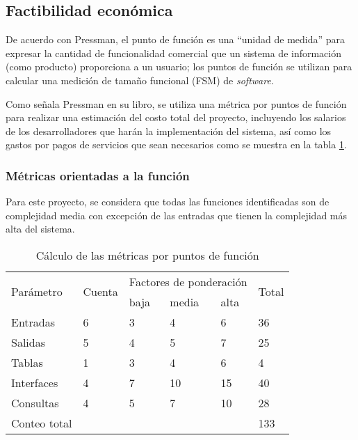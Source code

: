 \subsection{Factibilidad económica}

De acuerdo con Pressman\cite{pressman_software_2005}, el punto de función es una ``unidad de medida'' para expresar la cantidad de funcionalidad comercial que un sistema de información (como producto) proporciona a un usuario; los puntos de función se utilizan para calcular una medición de tamaño funcional (FSM) de \textit{software}.

Como señala Pressman en su libro, se utiliza una métrica por puntos de función para realizar una estimación del costo total del proyecto, incluyendo los salarios de los desarrolladores que harán la implementación del sistema, así como los gastos por pagos de servicios que sean necesarios como se muestra en la tabla \ref{tab:function_point_metrics}. 

\subsubsection*{Métricas orientadas a la función}


Para este proyecto, se considera que todas las funciones identificadas son de complejidad media con excepción de las entradas que tienen la complejidad más alta del sistema.


\begin{table}[H]
	\centering
	\begin{tabular}{|l|l|l|l|l|l|}
	\hline
	\multirow{2}{*}{Parámetro} & \multirow{2}{*}{Cuenta} & \multicolumn{3}{|l|}{Factores de ponderación} & \multirow{2}{*}{Total} \\ \cline{3-5}
														 &                         & baja       	& media       & alta		       &                        \\ \hline
	Entradas                   & 6                       & 3            & 4           & 6              & 36                     \\ \hline
	Salidas                     & 5                       & 4            & 5           & 7              & 25                     \\ \hline
	Tablas                     & 1                       & 3            & 4           & 6              & 4                      \\ \hline
	Interfaces                 & 4                       & 7            & 10          & 15             & 40                     \\ \hline
	Consultas                  & 4                       & 5            & 7           & 10             & 28                     \\ \hline
	Conteo total               &                         &              &             &		             & 133                    \\ \hline
	\end{tabular}
	\caption{Cálculo de las métricas por puntos de función}
	\label{tab:function_point_metrics}
	\end{table}


